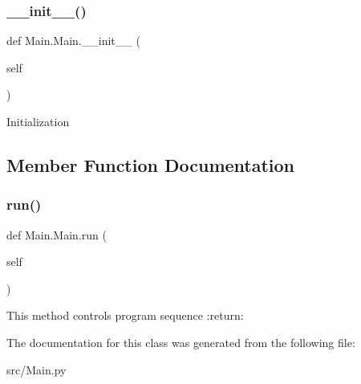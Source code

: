 \subsubsection{\texorpdfstring{\+\_\+\+\_\+init\+\_\+\+\_\+()}{\_\_init\_\_()}}
{\footnotesize\ttfamily def Main.\+Main.\+\_\+\+\_\+init\+\_\+\+\_\+ (\begin{DoxyParamCaption}\item[{}]{self }\end{DoxyParamCaption})}

\begin{DoxyVerb}Initialization
\end{DoxyVerb}
 

\subsection{Member Function Documentation}
\mbox{\label{class_main_1_1_main_ab9b18db6a7f0e5b336228e11d969bb76}} 
\subsubsection{\texorpdfstring{run()}{run()}}
{\footnotesize\ttfamily def Main.\+Main.\+run (\begin{DoxyParamCaption}\item[{}]{self }\end{DoxyParamCaption})}

\begin{DoxyVerb}This method controls program sequence
:return:
\end{DoxyVerb}
 

The documentation for this class was generated from the following file\+:\begin{DoxyCompactItemize}
\item 
src/Main.\+py\end{DoxyCompactItemize}
